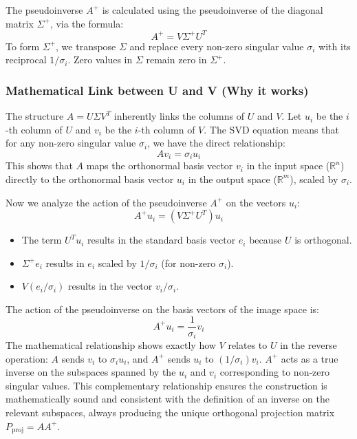 \begin{notechapter}
The pseudoinverse $A^+$ is calculated using the pseudoinverse of the diagonal matrix $\Sigma^+$, via the formula:
$$A^+ = V \Sigma^+ U^T$$
To form $\Sigma^+$, we transpose $\Sigma$ and replace every non-zero singular value $\sigma_i$ with its reciprocal $1/\sigma_i$. Zero values in $\Sigma$ remain zero in $\Sigma^+$.

\subsubsection*{Mathematical Link between U and V (Why it works)}

The structure $A = U \Sigma V^T$ inherently links the columns of $U$ and $V$. Let $u_i$ be the $i$-th column of $U$ and $v_i$ be the $i$-th column of $V$. The SVD equation means that for any non-zero singular value $\sigma_i$, we have the direct relationship:
$$A v_i = \sigma_i u_i$$
This shows that $A$ maps the orthonormal basis vector $v_i$ in the input space ($\mathbb{R}^n$) directly to the orthonormal basis vector $u_i$ in the output space ($\mathbb{R}^m$), scaled by $\sigma_i$.

Now we analyze the action of the pseudoinverse $A^+$ on the vectors $u_i$:
$$A^+ u_i = (V \Sigma^+ U^T) u_i$$
\begin{itemize}
    \item The term $U^T u_i$ results in the standard basis vector $e_i$ because $U$ is orthogonal.
    \item $\Sigma^+ e_i$ results in $e_i$ scaled by $1/\sigma_i$ (for non-zero $\sigma_i$).
    \item $V (e_i / \sigma_i)$ results in the vector $v_i / \sigma_i$.
\end{itemize}

The action of the pseudoinverse on the basis vectors of the image space is:
$$A^+ u_i = \frac{1}{\sigma_i} v_i$$
The mathematical relationship shows exactly how $V$ relates to $U$ in the reverse operation: $A$ sends $v_i$ to $\sigma_i u_i$, and $A^+$ sends $u_i$ to $(1/\sigma_i) v_i$. $A^+$ acts as a true inverse on the subspaces spanned by the $u_i$ and $v_i$ corresponding to non-zero singular values. This complementary relationship ensures the construction is mathematically sound and consistent with the definition of an inverse on the relevant subspaces, always producing the unique orthogonal projection matrix $P_{\text{proj}} = AA^+$.
\end{notechapter}
